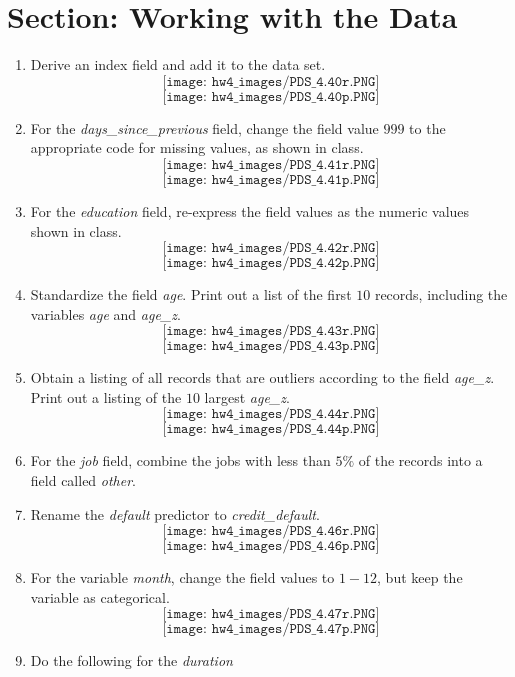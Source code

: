 \documentclass[11pt]{article}
\theoremstyle{definition}
\newcommand{\1}[1]{\mathbf{1} \left \{ #1 \right \}}
\begin{document}
\section{Section: Working with the Data}
\begin{enumerate}\addtocounter{enumi}{39}
    \item Derive an index field and add it to the data set.
    \[\texttt{[image: hw4\_images/PDS\_4.40r.PNG]}\]
    \[\texttt{[image: hw4\_images/PDS\_4.40p.PNG]}\]
    \item For the \textit{days\_since\_previous} field, change the field value $999$ to the appropriate code for missing values, as shown in class.
    \[\texttt{[image: hw4\_images/PDS\_4.41r.PNG]}\]
    \[\texttt{[image: hw4\_images/PDS\_4.41p.PNG]}\]
    \item For the \textit{education} field, re-express the field values as the numeric values shown in class.
    \[\texttt{[image: hw4\_images/PDS\_4.42r.PNG]}\]
    \[\texttt{[image: hw4\_images/PDS\_4.42p.PNG]}\]
    \item Standardize the field \textit{age}.  Print out a list of the first $10$ records, including the variables \textit{age} and \textit{age\_z}.
    \[\texttt{[image: hw4\_images/PDS\_4.43r.PNG]}\]
    \[\texttt{[image: hw4\_images/PDS\_4.43p.PNG]}\]
    \item Obtain a listing of all records that are outliers according to the field \textit{age\_z}.  Print out a listing of the $10$ largest \textit{age\_z}.
    \[\texttt{[image: hw4\_images/PDS\_4.44r.PNG]}\]
    \[\texttt{[image: hw4\_images/PDS\_4.44p.PNG]}\]
    \item For the \textit{job} field, combine the jobs with less than $5\%$ of the records into a field called \textit{other}.
    \item Rename the \textit{default} predictor to \textit{credit\_default}.
    \[\texttt{[image: hw4\_images/PDS\_4.46r.PNG]}\]
    \[\texttt{[image: hw4\_images/PDS\_4.46p.PNG]}\]
    \item For the variable \textit{month}, change the field values to $1-12$, but keep the variable as categorical.
    \[\texttt{[image: hw4\_images/PDS\_4.47r.PNG]}\]
    \[\texttt{[image: hw4\_images/PDS\_4.47p.PNG]}\]
    \item Do the following for the \textit{duration}
    \begin{enumerate}[(1)]

\end{enumerate}
\end{enumerate}
\end{document}
